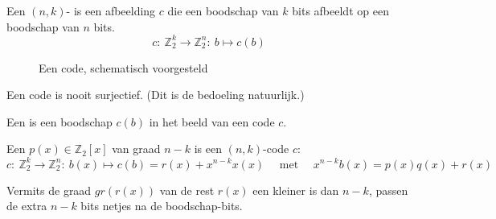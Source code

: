 \documentclass[main.tex]{subfiles}
\begin{document}
\begin{de}
  \label{de:code}
  Een $(n,k)$- is een afbeelding $c$ die een boodschap van $k$ bits afbeeldt op een boodschap van $n$ bits.
  \[ c:\ \mathbb{Z}_{2}^{k} \rightarrow \mathbb{Z}_{2}^{n}:\ b \mapsto c(b) \]

  \begin{figure}[H]
    \centering
    \caption{Een code, schematisch voorgesteld}
    \label{fig:code}
  \end{figure}
\end{de}

\begin{opm}
  Een code is nooit surjectief. (Dit is de bedoeling natuurlijk.)
\end{opm}

\begin{de}
  Een  is een boodschap $c(b)$ in het beeld van een code $c$.
\end{de}

\begin{de}
  Een  $p(x)\in \mathbb{Z}_{2}[x]$ van graad $n-k$ is een $(n,k)$-code $c$:
  \[ c:\ \mathbb{Z}_{2}^{k} \rightarrow \mathbb{Z}_{2}^{n}:\ b(x) \mapsto c(b) = r(x) + x^{n-k}x(x) \quad\text{ met }\quad x^{n-k}b(x) = p(x)q(x) + r(x) \]
\end{de}

\begin{opm}
  Vermits de graad $gr(r(x))$ van de rest $r(x)$ een kleiner is dan $n-k$, passen de extra $n-k$ bits netjes na de boodschap-bits.
\end{opm}

\end{document}
